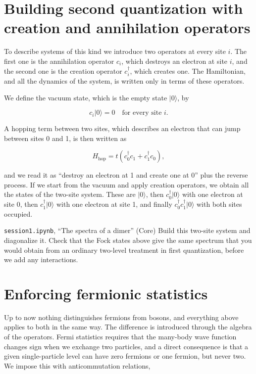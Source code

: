 \section{Building second quantization with creation and annihilation operators}

To describe systems of this kind we introduce two operators at every site $i$. The first one is the
annihilation operator $c_i$, which destroys an electron at site $i$, and the second one is the
creation operator $c_i^\dagger$, which creates one. The Hamiltonian, and all the dynamics of the
system, is written only in terms of these operators.

We define the vacuum state, which is the empty state $|0\rangle$, by

\begin{equation}
c_i|0\rangle = 0 \quad \text{for every site } i.
\end{equation}

A hopping term between two sites, which describes an electron that can jump between sites 0 and 1,
is then written as

\begin{equation}
H_\text{hop} = t\left(c_0^\dagger c_1 + c_1^\dagger c_0\right),
\end{equation}

and we read it as ``destroy an electron at 1 and create one at 0'' plus the reverse process. If we
start from the vacuum and apply creation operators, we obtain all the states of the two-site
system. These are $|0\rangle$, then $c_0^\dagger|0\rangle$ with one electron at site 0, then
$c_1^\dagger|0\rangle$ with one electron at site 1, and finally $c_0^\dagger c_1^\dagger|0\rangle$
with both sites occupied.

\begin{notebookbox}{\texttt{session1.ipynb}, ``The spectra of a dimer'' (Core)}
Build this two-site system and diagonalize it. Check that the Fock states above give the same
spectrum that you would obtain from an ordinary two-level treatment in first quantization, before
we add any interactions.
\end{notebookbox}

\section{Enforcing fermionic statistics}

Up to now nothing distinguishes fermions from bosons, and everything above applies to both in the
same way. The difference is introduced through the algebra of the operators. Fermi statistics
requires that the many-body wave function changes sign when we exchange two particles, and a
direct consequence is that a given single-particle level can have zero fermions or one fermion,
but never two. We impose this with anticommutation relations,

